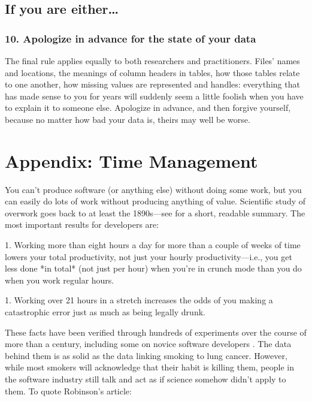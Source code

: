 \documentclass[10pt,letterpaper]{article}
\begin{document}
\subsection*{If you are either{\ldots}}

\subsubsection*{10. Apologize in advance for the state of your data}

The final rule applies equally to both researchers and practitioners. Files'
names and locations, the meanings of column headers in tables, how those tables
relate to one another, how missing values are represented and handles:
everything that has made sense to you for years will suddenly seem a little
foolish when you have to explain it to someone else. Apologize in advance, and
then forgive yourself, because no matter how bad your data is, theirs may well
be worse.

\section*{Appendix: Time Management}

You can't produce software (or anything else) without doing some work,
but you can easily do lots of work without producing anything of
value.  Scientific study of overwork goes back to at least the
1890s---see \cite{Robinson2005} for a short, readable summary.  The
most important results for developers are:

1.  Working more than eight hours a day for more than a couple of
    weeks of time lowers your total productivity, not just your hourly
    productivity---i.e., you get less done *in total* (not just per hour)
    when you're in crunch mode than you do when you work regular hours.

1.  Working over 21 hours in a stretch increases the odds of you making a
    catastrophic error just as much as being legally drunk.

These facts have been verified through hundreds of experiments over the course
of more than a century, including some on novice software developers
\cite{Fucci2020}.  The data behind them is as solid as the data linking
smoking to lung cancer.  However, while most smokers will acknowledge that their
habit is killing them, people in the software industry still talk and act as if
science somehow didn't apply to them.  To quote Robinson's article:
\end{document}
